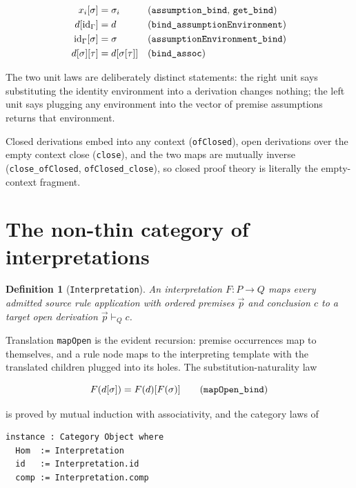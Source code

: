 \documentclass[]{article}
\newtheorem{definition}[theorem]{Definition}
\theoremstyle{remark}
\newcommand{\code}[1]{\texttt{#1}}
\newcommand{\od}[3]{\ensuremath{#2 \vdash_{#1} #3}}
\begin{document}
\begin{align*}
x_i[\sigma] &= \sigma_i
  && \text{(\code{assumption\_bind}, \code{get\_bind})} \\
d[\mathrm{id}_\Gamma] &= d
  && \text{(\code{bind\_assumptionEnvironment})} \\
\mathrm{id}_\Gamma[\sigma] &= \sigma
  && \text{(\code{assumptionEnvironment\_bind})} \\
d[\sigma][\tau] &= d[\sigma[\tau]]
  && \text{(\code{bind\_assoc})}
\end{align*}

The two unit laws are deliberately distinct statements: the right unit says
substituting the identity environment into a derivation changes nothing; the
left unit says plugging any environment into the vector of premise
assumptions returns that environment.

Closed derivations embed into any context (\code{ofClosed}), open
derivations over the empty context close (\code{close}), and the two maps
are mutually inverse (\code{close\_ofClosed}, \code{ofClosed\_close}), so
closed proof theory is literally the empty-context fragment.

\section{The non-thin category of interpretations}
\label{sec:interpretations}

\begin{definition}[\code{Interpretation}]
An interpretation $F : P \to Q$ maps every admitted source rule application
with ordered premises $\vec{p}$ and conclusion $c$ to a target open
derivation $\od{Q}{\vec{p}}{c}$.
\end{definition}

Translation \code{mapOpen} is the evident recursion: premise occurrences map
to themselves, and a rule node maps to the interpreting template with the
translated children plugged into its holes.  The substitution-naturality law

\[
F(d[\sigma]) = F(d)[F(\sigma)]
\qquad \text{(\code{mapOpen\_bind})}
\]

\noindent
is proved by mutual induction with associativity, and the category laws of

\begin{lstlisting}
instance : Category Object where
  Hom  := Interpretation
  id   := Interpretation.id
  comp := Interpretation.comp
\end{lstlisting}
\end{document}
